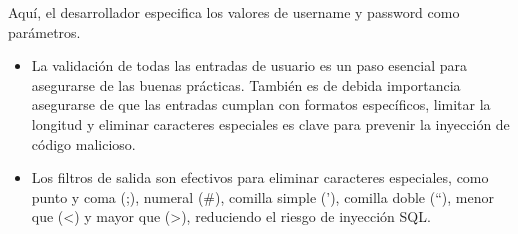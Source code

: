 \documentclass[11pt]{report}
\begin{document}
Aquí, el desarrollador especifica los valores de username y password como parámetros.
\begin{itemize}
  \item La validación de todas las entradas de usuario es un paso esencial para asegurarse de las buenas
  prácticas. También es de debida importancia asegurarse de que las entradas cumplan con formatos específicos,
  limitar la longitud y eliminar caracteres especiales es clave para prevenir la inyección de código malicioso.
  
  \item Los filtros de salida son efectivos para eliminar caracteres especiales, como punto y coma (;), numeral (\#),
  comilla simple ('), comilla doble (“), menor que (<) y mayor que (>), reduciendo el riesgo de inyección SQL.
\end{itemize}

\cleardoublepage
\end{document}
